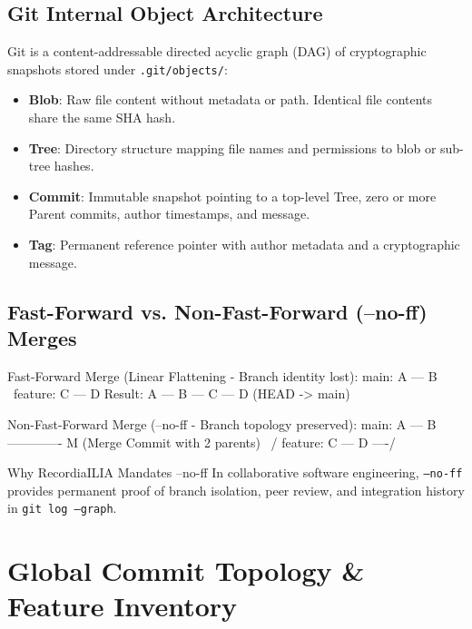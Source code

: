 \documentclass[10pt,a4paper]{article}
\begin{document}
\subsection{Git Internal Object Architecture}
Git is a content-addressable directed acyclic graph (DAG) of cryptographic snapshots stored under \texttt{.git/objects/}:
\begin{itemize}
    \item \textbf{Blob}: Raw file content without metadata or path. Identical file contents share the same SHA hash.
    \item \textbf{Tree}: Directory structure mapping file names and permissions to blob or sub-tree hashes.
    \item \textbf{Commit}: Immutable snapshot pointing to a top-level Tree, zero or more Parent commits, author timestamps, and message.
    \item \textbf{Tag}: Permanent reference pointer with author metadata and a cryptographic message.
\end{itemize}

\subsection{Fast-Forward vs. Non-Fast-Forward (--no-ff) Merges}
\begin{terminalbox}
Fast-Forward Merge (Linear Flattening - Branch identity lost):
main:    A --- B
                \
feature:         C --- D
Result:  A --- B --- C --- D  (HEAD -> main)

Non-Fast-Forward Merge (--no-ff - Branch topology preserved):
main:    A --- B ------------- M  (Merge Commit with 2 parents)
                \             /
feature:         C --- D ----/
\end{terminalbox}

\begin{gitconcept}{Why RecordiaILIA Mandates --no-ff}
In collaborative software engineering, \texttt{--no-ff} provides permanent proof of branch isolation, peer review, and integration history in \texttt{git log --graph}.
\end{gitconcept}

\section{Global Commit Topology \& Feature Inventory}
\end{document}
